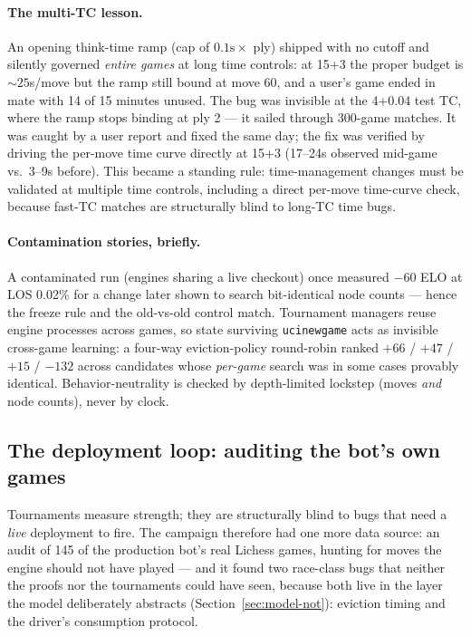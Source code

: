 \documentclass[11pt]{article}
\theoremstyle{plain}
\theoremstyle{definition}
\theoremstyle{remark}
\begin{document}
\paragraph{The multi-TC lesson.}
An opening think-time ramp (cap of $0.1\mathrm{s} \times$ ply) shipped
with no cutoff and silently governed \emph{entire games} at long time
controls: at 15+3 the proper budget is ${\sim}25$s/move but the ramp
still bound at move 60, and a user's game ended in mate with 14 of 15
minutes unused.  The bug was invisible at the 4+0.04 test TC, where the
ramp stops binding at ply 2 --- it sailed through 300-game matches.  It
was caught by a user report and fixed the same day; the fix was verified
by driving the per-move time curve directly at 15+3 (17--24s observed
mid-game vs.\ 3--9s before).  This became a standing rule:
time-management changes must be validated at multiple time controls,
including a direct per-move time-curve check, because fast-TC matches
are structurally blind to long-TC time bugs.

\paragraph{Contamination stories, briefly.}
A contaminated run (engines sharing a live checkout) once measured
$-60$ ELO at LOS 0.02\% for a change later shown to search bit-identical
node counts --- hence the freeze rule and the old-vs-old control match.
Tournament managers reuse engine processes across games, so state
surviving \texttt{ucinewgame} acts as invisible cross-game learning: a
four-way eviction-policy round-robin ranked
$+66$ / $+47$ / $+15$ / $-132$ across candidates whose \emph{per-game}
search was in some cases provably identical.  Behavior-neutrality is
checked by depth-limited lockstep (moves \emph{and} node counts), never
by clock.

\subsection{The deployment loop: auditing the bot's own games}
\label{sec:deployment}

Tournaments measure strength; they are structurally blind to bugs that
need a \emph{live} deployment to fire.  The campaign therefore had one
more data source: an audit of 145 of the production bot's real
Lichess games, hunting for moves the engine should not have played ---
and it found two race-class bugs that neither the proofs nor the
tournaments could have seen, because both live in the layer the model
deliberately abstracts (Section~\ref{sec:model-not}): eviction timing
and the driver's consumption protocol.
\end{document}
